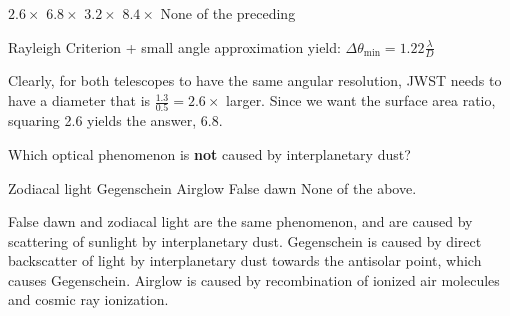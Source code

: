 \documentclass[a4paper,11pt]{exam}
\begin{document}
\begin{questions}
	\begin{oneparchoices}
		\choice $2.6\times$
		\correctchoice $6.8\times$
		\choice $3.2\times$
		\choice $8.4\times$
		\choice None of the preceding
	\end{oneparchoices}
	\begin{solution}
		Rayleigh Criterion + small angle approximation yield:
		$\displaystyle \Delta\theta_\text{min} = 1.22\frac{\lambda}{D} $

		Clearly, for both telescopes to have the same angular resolution, JWST needs to have a diameter that is $ \frac{1.3}{0.5} = 2.6\times $ larger. Since we want the surface area ratio, squaring 2.6 yields the answer, 6.8.
	\end{solution}

\filbreak
\question
	Which optical phenomenon is \textbf{not} caused by interplanetary dust?
	\begin{choices}
		\choice Zodiacal light
		\choice Gegenschein
		\correctchoice Airglow
		\choice False dawn
		\choice None of the above.
	\end{choices}
	\begin{solution}
		False dawn and zodiacal light are the same phenomenon, and are caused by scattering of sunlight by interplanetary dust. Gegenschein is caused by direct backscatter of light by interplanetary dust towards the antisolar point, which causes Gegenschein. Airglow is caused by recombination of ionized air molecules and cosmic ray ionization.
	\end{solution}


\end{questions}
\end{document}
